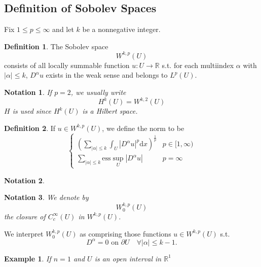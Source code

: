 \documentclass{article}
\newtheorem{notation}{Notation}
\newtheorem{example}{Example}[section]
\theoremstyle{definition}
\newtheorem{definition}{Definition}[section]
\begin{document}
\subsection{Definition of Sobolev Spaces}
Fix $1\le p\le \infty$ and let $k$ be a nonnegative integer. 
\begin{definition}
    The Sobolev space \[W^{k,p}(U)\] consists of all locally summable function $u:U\to\mathbb{R}$ s.t. for each multiindex $\alpha$ with $|\alpha|\le k$,
    $D^\alpha u$ exists in the weak sense and belongs to $L^p(U)$.
\end{definition}
\begin{notation}
    If $p=2$, we usually write \[H^k(U)=W^{k,2}(U)\] 
    $H$ is used since $H^k(U)$ is a Hilbert space.
\end{notation}

\begin{definition}
    If $u\in W^{k,p}(U)$, we define the norm to be 
    \begin{equation}
        \left\{\begin{matrix}
            (\sum_{|\alpha|\le k}\int_U |D^\alpha u|^p\mathrm{d}x)^{\frac{1}{p}}  & p\in [1,\infty)\\
             \sum_{|\alpha|\le k} \text{ess}\sup_U |D^\alpha u| & p=\infty
            \end{matrix}\right.            
    \end{equation}
\end{definition}

\begin{notation}
    
\end{notation}

\begin{notation}
    We denote by \[W_0^{k,p}(U)\] the closure of $C_c^\infty(U)$ in $W^{k,p}(U)$.
\end{notation}
We interpret $W_0^{k,p}(U)$ as comprising those functions $u\in W^{k,p}(U)$ s.t. 
\[D^\alpha=0\text{ on }\partial U\quad \forall |\alpha|\leq k-1. \]

\begin{example}
    If $n=1$ and $U$ is an open interval in $\mathbb{R}^1$
\end{example}
\end{document}
